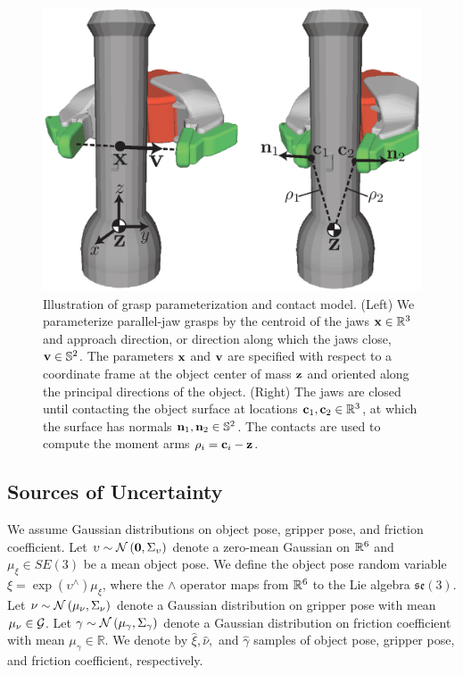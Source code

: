 \begin{figure}[t!]
\centering
\includegraphics[scale=0.44]{figures/illustrations/dexnet_grasping_model.eps}
\caption{Illustration of grasp parameterization and contact model. (Left) We parameterize parallel-jaw grasps by the centroid of the jaws $\mathbf{x} \in \mathbb{R}^3$ and approach direction, or direction along which the jaws close, $\mathbf{v} \in \mathbb{S}^2$. The parameters $\mathbf{x}$ and $\mathbf{v}$ are specified with respect to a coordinate frame at the object center of mass $\mathbf{z}$ and oriented along the principal directions of the object. (Right) The jaws are closed until contacting the object surface at locations $\mathbf{c}_1, \mathbf{c}_2 \in \mathbb{R}^3$, at which the surface has normals $\mathbf{n}_1, \mathbf{n}_2 \in \mathbb{S}^2$. The contacts are used to compute the moment arms $\rho_i = \mathbf{c}_i - \mathbf{z}$.
}
\vspace*{-15pt}
\end{figure}

\subsection{Sources of Uncertainty}
We assume Gaussian distributions on object pose, gripper pose, and friction coefficient.
Let $\upsilon \sim \mathcal{N}\left(\mathbf{0}, \Sigma_{\upsilon}\right)$ denote a zero-mean Gaussian on $\mathbb{R}^6$ and $\mu_{\xi} \in SE(3)$ be a mean object pose.
We define the object pose random variable $\xi = \exp\left( \upsilon^{\wedge} \right) \mu_{\xi}$, where the $\wedge$ operator maps from $\mathbb{R}^6$ to the Lie algebra $\mathfrak{se}(3)$.
Let $\nu \sim \mathcal{N}\left(\mu_{\nu}, \Sigma_{\nu}\right)$ denote a Gaussian distribution on gripper pose with mean $\mu_{\nu} \in \mathcal{G}$.
Let $\gamma \sim \mathcal{N}\left(\mu_{\gamma}, \Sigma_{\gamma} \right)$ denote a Gaussian distribution on friction coefficient with mean $\mu_{\gamma} \in \mathbb{R}$.
We denote by $\hat{\xi}, \hat{\nu},$ and $\hat{\gamma}$ samples of object pose, gripper pose, and friction coefficient, respectively. 

